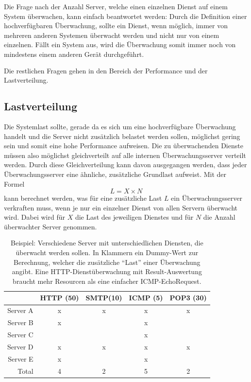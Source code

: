 Die Frage nach der Anzahl Server, welche einen einzelnen Dienst auf einem System \"uberwachen, kann einfach beantwortet werden: Durch die Definition einer hochverf\"ugbaren \"Uberwachung, sollte ein Dienst, wenn m\"oglich, immer von mehreren anderen Systemen \"uberwacht werden und nicht nur von einem einzelnen. F\"allt ein System aus, wird die \"Uberwachung somit immer noch von mindestens einem anderen Ger\"at durchgef\"uhrt.

Die restlichen Fragen gehen in den Bereich der Performance und der Lastverteilung.

\subsection{Lastverteilung} \label{sec:theorie-frag-last}
Die Systemlast sollte, gerade da es sich um eine hochverf\"ugbare \"Uberwachung handelt und die Server nicht zus\"atzlich belastet werden sollen, m\"oglichst gering sein und somit eine hohe Performance aufweisen. Die zu \"uberwachenden Dienste m\"ussen also m\"oglichst gleichverteilt auf alle internen \"Uberwachungsserver verteilt werden. Durch diese Gleichverteilung kann davon ausgegangen werden, dass jeder \"Uberwachungsserver eine \"ahnliche, zus\"atzliche Grundlast aufweist. Mit der Formel
\begin{equation}
 L = {X \times N}
\label{eq:theorie-frag-nonshared}
\end{equation}
kann berechnet werden, was f\"ur eine zus\"atzliche Last $L$ ein \"Uberwachungsserver verkraften muss, wenn je nur ein einzelner Dienst von allen Servern \"uberwacht wird. Dabei wird f\"ur $X$ die Last des jeweiligen Dienstes und f\"ur $N$ die Anzahl \"uberwachter Server genommen.

\begin{table}[ht]
 \centering
 \begin{tabular}{r|c|c|c|c}
   & HTTP (50) & SMTP(10) & ICMP (5) & POP3 (30) \\
  \hline
  Server A & x & x & x & x \\
  \hline
  Server B & x &   & x &   \\
  \hline
  Server C &   &   & x &   \\
  \hline
  Server D & x & x & x & x \\
  \hline
  Server E & x &   & x &   \\
  \hline
  Total    & 4 & 2 & 5 & 2
 \end{tabular}
 \caption[Zu \"uberwachende Server und Dienste]{Beispiel: Verschiedene Server mit unterschiedlichen Diensten, die \"uberwacht werden sollen. In Klammern ein Dummy-Wert zur Berechnung, welcher die zus\"atzliche "`Last"' einer \"Uberwachung angibt. Eine HTTP-Dienst\"uberwachung mit Result-Auswertung braucht mehr Resourcen als eine einfacher ICMP-EchoRequest.}
 \label{tbl:theorie-frag-hosts}
\end{table}

